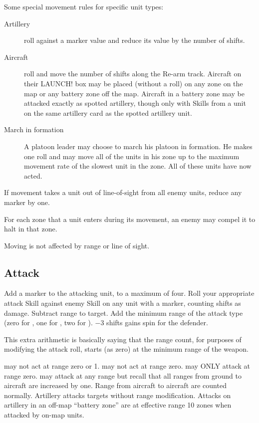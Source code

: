Some special movement rules for specific unit types:

\begin{description}
\item [Artillery]
roll  against a \SPOTTED{} marker value and reduce its value by the number of shifts.

\item [Aircraft]
roll  and move the number of shifts along the Re-arm track. Aircraft on their LAUNCH! box may be placed (without a roll) on any zone on the map or any battery zone off the map. Aircraft in a battery zone may be attacked exactly as spotted artillery, though only with  Skills from a unit on the same artillery card as the spotted artillery unit.

\item[March in formation]
A platoon leader may choose to march his platoon in formation. He makes one  roll and may move all of the units in his zone up to the maximum movement rate of the slowest unit in the zone. All of these units have now acted.
\end{description}



If movement takes a unit out of line-of-sight from all enemy units, reduce any \SPOTTED{} marker by one.

For each zone that a unit enters during its movement, an enemy may compel it to halt in that zone.

Moving is not affected by range or line of sight.


\subsection{Attack}\label{sec:platoon-combat-attack}

Add a \SPOTTED{} marker to the attacking unit, to a maximum of four. Roll your appropriate attack Skill against enemy  Skill on any unit with a \SPOTTED{} marker, counting shifts as damage. Subtract range to target. Add the minimum range of the attack type (zero for , one for , two for ). $-3$ shifts gains spin for the defender.

This extra arithmetic is basically saying that the range count, for purposes of modifying the attack roll, starts (as zero) at the minimum range of the weapon.

 may not act at range zero or 1.  may not act at range zero.  may ONLY attack at range zero.  may attack at any range but recall that all ranges from ground to aircraft are increased by one. Range from aircraft to aircraft are counted normally. Artillery attacks targets without range modification. Attacks on artillery in an off-map ``battery zone'' are at effective range 10 zones when attacked by on-map units.

